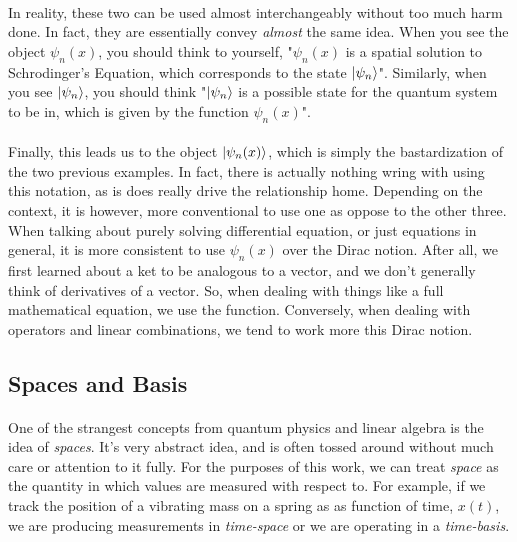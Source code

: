 \documentclass[12pt,letterpaper]{book}
\begin{document}
\paragraph*{}In reality, these two can be used almost interchangeably without too much harm done. In fact, they are essentially convey \textit{almost} the same idea. When you see the object $\psi_n(x)$, you should think to yourself, "$\psi_n(x)$ is a spatial solution to Schrodinger's Equation, which corresponds to the state $\ket{\psi_n}$". Similarly, when you see $\ket{\psi_n}$, you should think "$\ket{\psi_n}$ is a possible state for the quantum system to be in, which is given by the function $\psi_n(x)$".

\paragraph*{}Finally, this leads us to the object $\ket{\psi_n(x)}$, which is simply the bastardization of the two previous examples. In fact, there is actually nothing wring with using this notation, as is does really drive the relationship home. Depending on the context, it is however, more conventional to use one as oppose to the other three. When talking about purely solving differential equation, or just equations in general, it is more consistent to use $\psi_n(x)$ over the Dirac notion. After all, we first learned about a ket to be analogous to a vector, and we don't generally think of derivatives of a vector. So, when dealing with things like a full mathematical equation, we use the function. Conversely, when dealing with operators and linear combinations, we tend to work more this Dirac notion.


\subsection*{Spaces and Basis}

\paragraph*{}One of the strangest concepts from quantum physics and linear algebra is the idea of \textit{spaces}. It's very abstract idea, and is often tossed around without much care or attention to it fully. For the purposes of this work, we can treat \textit{space} as the quantity in which values are measured with respect to. For example, if we track the position of a vibrating mass on a spring as as function of time, $x(t)$, we are producing measurements in \textit{time-space} or we are operating in a \textit{time-basis}.
\end{document}
